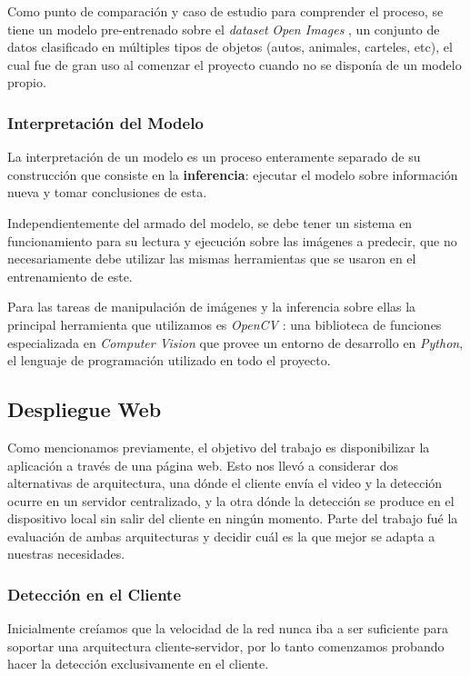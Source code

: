 \documentclass[a4paper]{article}
\begin{document}
Como punto de comparación y caso de estudio para comprender el proceso, se tiene un modelo pre-entrenado sobre el \textit{dataset} \textit{Open Images} \cite{openimages}, un conjunto de datos clasificado en múltiples tipos de objetos (autos, animales, carteles, etc), el cual fue de gran uso al comenzar el proyecto cuando no se disponía de un modelo propio.

\subsubsection{Interpretación del Modelo}

La interpretación de un modelo es un proceso enteramente separado de su construcción que consiste en la \textbf{inferencia}: ejecutar el modelo sobre información nueva y tomar conclusiones de esta.

Independientemente del armado del modelo, se debe tener un sistema en funcionamiento para su lectura y ejecución sobre las imágenes a predecir, que no necesariamente debe utilizar las mismas herramientas que se usaron en el entrenamiento de este.

Para las tareas de manipulación de imágenes y la inferencia sobre ellas la principal herramienta que utilizamos es \textit{OpenCV} \cite{opencv}: una biblioteca de funciones especializada en \textit{Computer Vision} que provee un entorno de desarrollo en \textit{Python}, el lenguaje de programación utilizado en todo el proyecto.

\subsection{Despliegue Web}

Como mencionamos previamente, el objetivo del trabajo es disponibilizar la aplicación a través de una página web. Esto nos llevó a considerar dos alternativas de arquitectura, una dónde el cliente envía el video y la detección ocurre en un servidor centralizado, y la otra dónde la detección se produce en el dispositivo local sin salir del cliente en ningún momento. Parte del trabajo fué la evaluación de ambas arquitecturas y decidir cuál es la que mejor se adapta a nuestras necesidades.

\subsubsection{Detección en el Cliente}

Inicialmente creíamos que la velocidad de la red nunca iba a ser suficiente para soportar una arquitectura cliente-servidor, por lo tanto comenzamos probando hacer la detección exclusivamente en el cliente.
\end{document}
